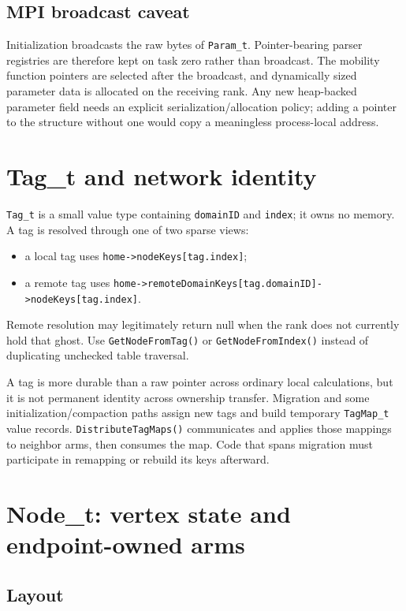 \documentclass[11pt]{article}
\newcommand{\code}[1]{\texorpdfstring{\nolinkurl{#1}}{#1}}
\begin{document}
\subsection{MPI broadcast caveat}

Initialization broadcasts the raw bytes of \code{Param_t}.  Pointer-bearing
parser registries are therefore kept on task zero rather than broadcast.  The
mobility function pointers are selected after the broadcast, and dynamically
sized parameter data is allocated on the receiving rank.  Any new heap-backed
parameter field needs an explicit serialization/allocation policy; adding a
pointer to the structure without one would copy a meaningless process-local
address.

\section{Tag\_t and network identity}

\code{Tag_t} is a small value type containing \code{domainID} and
\code{index}; it owns no memory.  A tag is resolved through one of two sparse
views:

\begin{itemize}
\item a local tag uses \code{home->nodeKeys[tag.index]};
\item a remote tag uses
\code{home->remoteDomainKeys[tag.domainID]->nodeKeys[tag.index]}.
\end{itemize}

Remote resolution may legitimately return null when the rank does not
currently hold that ghost.  Use \code{GetNodeFromTag()} or
\code{GetNodeFromIndex()} instead of duplicating unchecked table traversal.

A tag is more durable than a raw pointer across ordinary local calculations,
but it is not permanent identity across ownership transfer.  Migration and
some initialization/compaction paths assign new tags and build temporary
\code{TagMap_t} value records.  \code{DistributeTagMaps()} communicates and
applies those mappings to neighbor arms, then consumes the map.  Code that
spans migration must participate in remapping or rebuild its keys afterward.

\section{Node\_t: vertex state and endpoint-owned arms}

\subsection{Layout}
\end{document}
